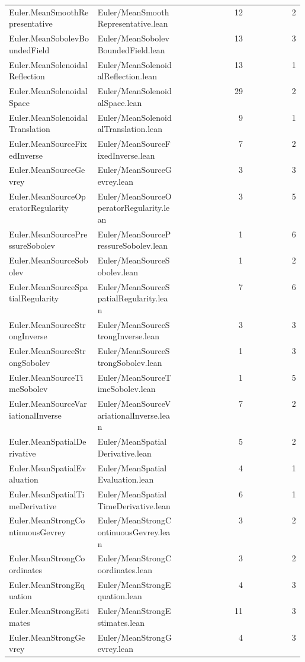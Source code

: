 \begin{longtable}{p{0.30\linewidth}p{0.28\linewidth}rr}
Euler.MeanSmoothRepresentative & Euler/MeanSmoothRepresentative.lean & 12 & 2\\
Euler.MeanSobolevBoundedField & Euler/MeanSobolevBoundedField.lean & 13 & 3\\
Euler.MeanSolenoidalReflection & Euler/MeanSolenoidalReflection.lean & 13 & 1\\
Euler.MeanSolenoidalSpace & Euler/MeanSolenoidalSpace.lean & 29 & 2\\
Euler.MeanSolenoidalTranslation & Euler/MeanSolenoidalTranslation.lean & 9 & 1\\
Euler.MeanSourceFixedInverse & Euler/MeanSourceFixedInverse.lean & 7 & 2\\
Euler.MeanSourceGevrey & Euler/MeanSourceGevrey.lean & 3 & 3\\
Euler.MeanSourceOperatorRegularity & Euler/MeanSourceOperatorRegularity.lean & 3 & 5\\
Euler.MeanSourcePressureSobolev & Euler/MeanSourcePressureSobolev.lean & 1 & 6\\
Euler.MeanSourceSobolev & Euler/MeanSourceSobolev.lean & 1 & 2\\
Euler.MeanSourceSpatialRegularity & Euler/MeanSourceSpatialRegularity.lean & 7 & 6\\
Euler.MeanSourceStrongInverse & Euler/MeanSourceStrongInverse.lean & 3 & 3\\
Euler.MeanSourceStrongSobolev & Euler/MeanSourceStrongSobolev.lean & 1 & 3\\
Euler.MeanSourceTimeSobolev & Euler/MeanSourceTimeSobolev.lean & 1 & 5\\
Euler.MeanSourceVariationalInverse & Euler/MeanSourceVariationalInverse.lean & 7 & 2\\
Euler.MeanSpatialDerivative & Euler/MeanSpatialDerivative.lean & 5 & 2\\
Euler.MeanSpatialEvaluation & Euler/MeanSpatialEvaluation.lean & 4 & 1\\
Euler.MeanSpatialTimeDerivative & Euler/MeanSpatialTimeDerivative.lean & 6 & 1\\
Euler.MeanStrongContinuousGevrey & Euler/MeanStrongContinuousGevrey.lean & 3 & 2\\
Euler.MeanStrongCoordinates & Euler/MeanStrongCoordinates.lean & 3 & 2\\
Euler.MeanStrongEquation & Euler/MeanStrongEquation.lean & 4 & 3\\
Euler.MeanStrongEstimates & Euler/MeanStrongEstimates.lean & 11 & 3\\
Euler.MeanStrongGevrey & Euler/MeanStrongGevrey.lean & 4 & 3\\

\end{longtable}
